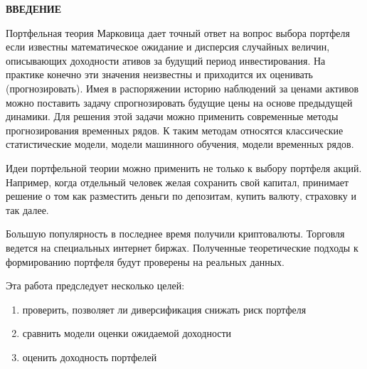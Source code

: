 \newpage
{}
\begin{center}
	\textbf{\large ВВЕДЕНИЕ}
\end{center}

Портфельная теория Марковица дает точный ответ на вопрос выбора портфеля если известны математическое ожидание
и дисперсия случайных величин, описывающих доходности ативов за будущий период инвестирования. На практике конечно эти значения неизвестны
и приходится их оценивать (прогнозировать). Имея в распоряжении историю наблюдений за ценами активов можно поставить задачу
спрогнозировать будущие цены на основе предыдущей динамики. Для решения этой задачи можно применить современные методы
прогнозирования временных рядов. К таким методам относятся классические статистические модели, модели машинного обучения, модели временных рядов.

Идеи портфельной теории можно применить не только к выбору портфеля акций. Например, когда отдельный человек желая сохранить свой капитал,
принимает решение о том как разместить деньги по депозитам, купить валюту, страховку и так далее.

Большую популярность в последнее время получили криптовалюты. Торговля ведется на специальных интернет биржах.
Полученные теоретические подходы к формированию портфеля будут проверены на реальных данных.

Эта работа предследует несколько целей:
\begin{enumerate}
	\item проверить, позволяет ли диверсификация снижать риск портфеля
	\item сравнить модели оценки ожидаемой доходности
	\item оценить доходность портфелей
\end{enumerate}